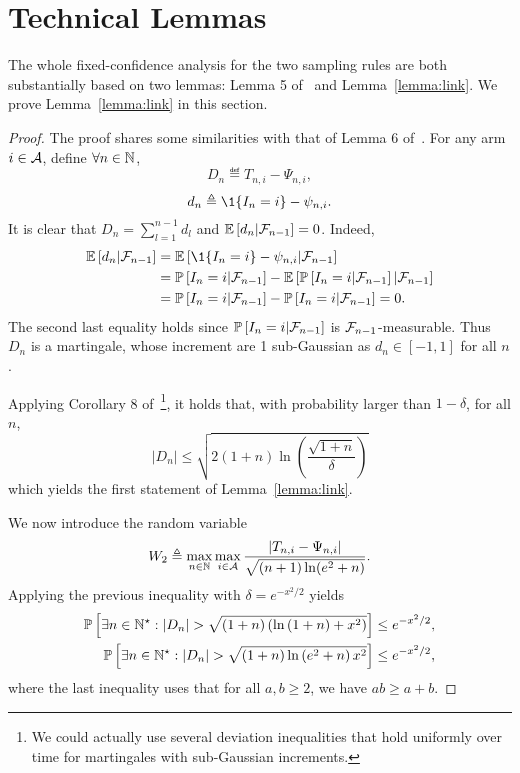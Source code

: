 \section{Technical Lemmas}\label{app:lemmas}

The whole fixed-confidence analysis for the two sampling rules are both substantially based on two lemmas: Lemma 5 of~\cite{qin2017ttei} and Lemma~\ref{lemma:link}. We prove Lemma~\ref{lemma:link} in this section.

\restatewtwo*

\begin{proof}

The proof shares some similarities with that of Lemma 6 of~\cite{qin2017ttei}.
For any arm $i\in\mathcal{A}$, define $\forall n\in{\mathbb N}$,
\[
    D_n \eqdef T_{n,i} - \Psi_{n,i},
\]
\[
    d_n \eqdef \1{\{I_n=i\}} - \psi_{n,i}.
\]
It is clear that $D_n = \sum_{l=1}^{n-1} d_l$ and $\mathbb{E}\left[d_n|\mathcal{F}_{n-1}\right] = 0$. Indeed,
\begin{align*}
    \EE{d_n|\cF_{n-1}} &= \EE{\1{\{I_n=i\}} - \psi_{n,i}|\cF_{n-1}} \\
                       &= \PP{I_n=i|\cF_{n-1}} - \EE{\PP{I_n=i|\cF_{n-1}}|\cF_{n-1}} \\
                       &= \PP{I_n=i|\cF_{n-1}} - \PP{I_n=i|\cF_{n-1}} = 0.
\end{align*}
The second last equality holds since $\mathbb{P}\left[I_n=i|\mathcal{F}_{n-1}\right]$ is $\mathcal{F}_{n-1}$-measurable. Thus $D_n$ is a martingale, whose increment are 1 sub-Gaussian as $d_n \in [-1,1]$ for all $n$. 

Applying Corollary 8 of~\cite{abbasi-yadkori2012}\footnote{We could actually use several deviation inequalities that hold uniformly over time for martingales with sub-Gaussian increments.}, it holds that, with probability larger than $1-\delta$, for all $n$,
\[
    |D_n| \leq \sqrt{2\left(1+n\right)\ln\left(\frac{\sqrt{1+n}}{\delta}\right)}
\]
which yields the first statement of Lemma~\ref{lemma:link}.

We now introduce the random variable
\[
    W_2 \triangleq \max_{n\in{\mathbb N}}\max_{i\in\mathcal{A}} \frac{|T_{n,i}-\Psi_{n,i}|}{\sqrt{(n+1)\ln(e^2+n)}}.
\]
Applying the previous inequality with $\delta = e^{-x^2 / 2}$ yields 
\begin{align*}
          \mathbb{P}\left[\exists n \in \mathbb{N}^\star : |D_n | > \sqrt{\left(1+n\right)\left(\ln\left(1+n \right)+x^2\right)}\right] &\leq e^{-x^2 / 2}, \\
          \mathbb{P}\left[\exists n \in \mathbb{N}^\star : |D_n | > \sqrt{\left(1+n\right)\ln\left(e^2+n \right)x^2}\right] &\leq e^{-x^2 / 2},
\end{align*}
where the last inequality uses that for all $a,b \geq 2$, we have $ab \geq a+b$. 


\end{proof}
